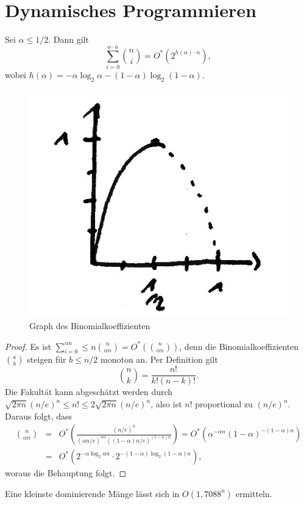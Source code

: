 \chapter{Dynamisches Programmieren}

  
  
  
  \begin{lemma}
    Sei \(\alpha \leq 1/2\). Dann gilt \[ \sum_{i=0}^{\alpha \cdot n} \binom{n}{i} = O^*( 2^{h(\alpha) \cdot n} ), \] wobei \(h(\alpha) = - \alpha \log_2 \alpha - (1-\alpha) \log_2(1 - \alpha)\).
  \end{lemma}
  
  \begin{figure}[h]
    \centering
    \includegraphics[width=.25\textwidth]{./Bilder/b01.jpg}
    \caption{Graph des Binomialkoeffizienten}
  \end{figure}
  
  \begin{proof}
    Es ist \( \sum_{i=0}^{\alpha n} \leq n \binom{n}{\alpha n} = O^*( \binom{n}{\alpha n} ) \), denn die Binomialkoeffizienten \( \binom{a}{b} \) steigen für \(b \leq n/2\) monoton an. Per Definition gilt 
    \[
      \binom{n}{k} = \frac{n!}{k! (n-k)!}.
    \]
    Die Fakultät kann abgeschätzt werden durch \( \sqrt{2 \pi n} (n/e)^n \leq n! \leq 2 \sqrt{2 \pi n} (n/e)^n \), also ist \(n!\) proportional zu \((n/e)^n\). Daraus folgt, dass 
    \begin{eqnarray*}
      \binom{n}{\alpha n} &=& O^* \left( \frac{(n/e)^n}{(\alpha n/e)^{\alpha n} ( (1-\alpha)n/e)^{(1-\alpha) n}} \right) = O^* \left( \alpha^{-\alpha n} (1-\alpha)^{-(1-\alpha)n} \right) \\
      &=& O^* \left( 2^{-\alpha \log_2 \alpha n} \cdot 2^{-(1 - \alpha) \log_2(1-\alpha)n} \right),
    \end{eqnarray*}
    woraus die Behauptung folgt.
  \end{proof}
  
  \begin{theorem}
    Eine kleinste dominierende Mänge lässt sich in \(O(1,7088^n)\) ermitteln.
  \end{theorem}
  

